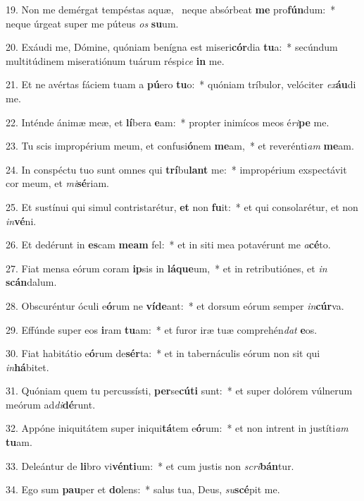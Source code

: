 19. Non me demérgat tempéstas aquæ, \dag\  neque absórbeat \textbf{me} pro\textbf{fún}dum:~*  neque úrgeat super me púteus \textit{os} \textbf{su}um.\

20. Exáudi me, Dómine, quóniam benígna est miseri\textbf{cór}dia \textbf{tu}a:~*  secúndum multitúdinem miseratiónum tuárum réspi\textit{ce} \textbf{in} me.\

21. Et ne avértas fáciem tuam a \textbf{pú}ero \textbf{tu}o:~*  quóniam tríbulor, velóciter \textit{ex}\textbf{áu}di me.\

22. Inténde ánimæ meæ, et \textbf{lí}bera \textbf{e}am:~*  propter inimícos meos é\textit{ri}\textbf{pe} me.\

23. Tu scis impropérium meum, et confusi\textbf{ó}nem \textbf{me}am,~*  et reverénti\textit{am} \textbf{me}am.\

24. In conspéctu tuo sunt omnes qui \textbf{trí}bu\textbf{lant} me:~*  impropérium exspectávit cor meum, et \textit{mi}\textbf{sé}riam.\

25. Et sustínui qui simul contristarétur, \textbf{et} non \textbf{fu}it:~*  et qui consolarétur, et non \textit{in}\textbf{vé}ni.\

26. Et dedérunt in \textbf{es}cam \textbf{me}\textbf{am} fel:~*  et in siti mea potavérunt me \textit{a}\textbf{cé}to.\

27. Fiat mensa eórum coram \textbf{ip}sis in \textbf{lá}\textbf{que}um,~*  et in retributiónes, et \textit{in} \textbf{scán}dalum.\

28. Obscuréntur óculi e\textbf{ó}rum ne \textbf{ví}\textbf{de}ant:~*  et dorsum eórum semper \textit{in}\textbf{cúr}va.\

29. Effúnde super eos \textbf{i}ram \textbf{tu}am:~*  et furor iræ tuæ comprehén\textit{dat} \textbf{e}os.\

30. Fiat habitátio e\textbf{ó}rum de\textbf{sér}ta:~*  et in tabernáculis eórum non sit qui \textit{in}\textbf{há}bitet.\

31. Quóniam quem tu percussísti, \textbf{per}se\textbf{cú}\textbf{ti} sunt:~*  et super dolórem vúlnerum meórum ad\textit{di}\textbf{dé}runt.\

32. Appóne iniquitátem super iniqui\textbf{tá}tem e\textbf{ó}rum:~*  et non intrent in justíti\textit{am} \textbf{tu}am.\

33. Deleántur de \textbf{li}bro vi\textbf{vén}\textbf{ti}um:~*  et cum justis non \textit{scri}\textbf{bán}tur.\

34. Ego sum \textbf{pau}per et \textbf{do}lens:~*  salus tua, Deus, \textit{su}\textbf{scé}pit me.\

